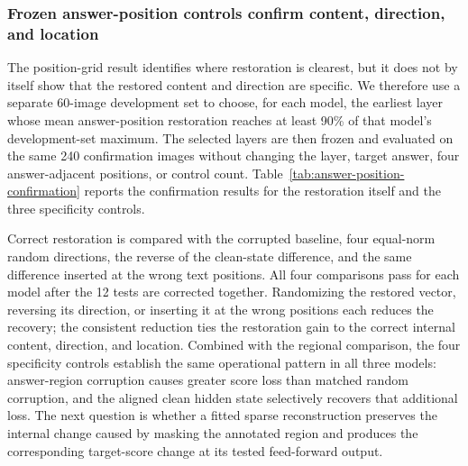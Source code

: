 \subsubsection{Frozen answer-position controls confirm content, direction, and location}

The position-grid result identifies where restoration is clearest, but it does not by itself show that the restored content and direction are specific. We therefore use a separate 60-image development set to choose, for each model, the earliest layer whose mean answer-position restoration reaches at least 90\% of that model's development-set maximum. The selected layers are then frozen and evaluated on the same 240 confirmation images without changing the layer, target answer, four answer-adjacent positions, or control count. Table~\ref{tab:answer-position-confirmation} reports the confirmation results for the restoration itself and the three specificity controls.



Correct restoration is compared with the corrupted baseline, four equal-norm random directions, the reverse of the clean-state difference, and the same difference inserted at the wrong text positions. All four comparisons pass for each model after the 12 tests are corrected together. Randomizing the restored vector, reversing its direction, or inserting it at the wrong positions each reduces the recovery; the consistent reduction ties the restoration gain to the correct internal content, direction, and location. Combined with the regional comparison, the four specificity controls establish the same operational pattern in all three models: answer-region corruption causes greater score loss than matched random corruption, and the aligned clean hidden state selectively recovers that additional loss. The next question is whether a fitted sparse reconstruction preserves the internal change caused by masking the annotated region and produces the corresponding target-score change at its tested feed-forward output.

\FloatBarrier
